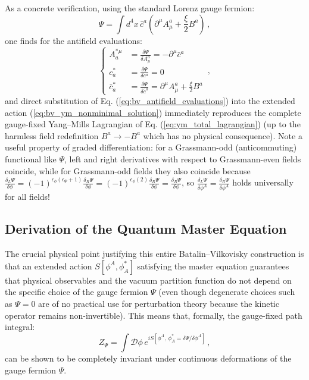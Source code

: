 As a concrete verification, using the standard Lorenz gauge fermion:
\begin{equation} \label{eq:bv_example_gauge_fermion}
    \Psi = \int d^4x \, \bar{c}^a \left( \partial^\mu A_\mu^a + \frac{\xi}{2} B^a \right) \, ,
\end{equation}
one finds for the antifield evaluations:
\begin{equation} \label{eq:bv_antifield_evaluations}
    \left\{
    \begin{aligned}
        A_a^{*\mu}  & = \frac{\delta \Psi}{\delta A_\mu^a} = -\partial^\mu \bar{c}^a                    \\
        c_a^*       & = \frac{\delta \Psi}{\delta c^a} = 0                                              \\
        \bar{c}_a^* & = \frac{\delta \Psi}{\delta \bar{c}^a} = \partial^\mu A_\mu^a + \frac{\xi}{2} B^a
    \end{aligned}
    \right. \, ,
\end{equation}
and direct substitution of Eq. (\ref{eq:bv_antifield_evaluations}) into the extended action (\ref{eq:bv_ym_nonminimal_solution}) immediately reproduces the complete gauge-fixed Yang--Mills Lagrangian of Eq. (\ref{eq:ym_total_lagrangian}) (up to the harmless field redefinition \(B^a \rightarrow -B^a\) which has no physical consequence). Note a useful property of graded differentiation: for a Grassmann-odd (anticommuting) functional like \(\Psi\), left and right derivatives with respect to Grassmann-even fields coincide, while for Grassmann-odd fields they also coincide because \(\frac{\delta_L \Psi}{\delta \phi} = (-1)^{\epsilon_\phi(\epsilon_\Psi + 1)} \frac{\delta_R \Psi}{\delta \phi} = (-1)^{\epsilon_\phi(2)} \frac{\delta_R \Psi}{\delta \phi} = \frac{\delta_R \Psi}{\delta \phi}\), so \(\frac{\delta_L \Psi}{\delta \phi^A} = \frac{\delta_R \Psi}{\delta \phi^A}\) holds universally for all fields!

\subsection{Derivation of the Quantum Master Equation}

The crucial physical point justifying this entire Batalin--Vilkovisky construction is that an extended action \(S[\phi^A, \phi_A^*]\) satisfying the master equation guarantees that physical observables and the vacuum partition function do not depend on the specific choice of the gauge fermion \(\Psi\) (even though degenerate choices such as \(\Psi = 0\) are of no practical use for perturbation theory because the kinetic operator remains non-invertible). This means that, formally, the gauge-fixed path integral:
\begin{equation} \label{eq:bv_gauge_fixed_path_integral}
    Z_\Psi = \int \mathcal{D}\phi \, e^{i S[\phi^A, \, \phi_A^* = \delta\Psi / \delta\phi^A]} \, ,
\end{equation}
can be shown to be completely invariant under continuous deformations of the gauge fermion \(\Psi\).

